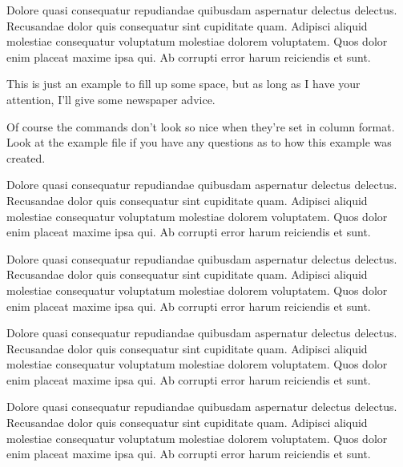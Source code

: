 \documentclass{article}
\begin{document}
\begin{multicols}{2}
{Dolore quasi consequatur repudiandae quibusdam aspernatur delectus delectus. Recusandae dolor quis consequatur sint cupiditate quam. Adipisci aliquid molestiae consequatur voluptatum molestiae dolorem voluptatem. Quos dolor enim placeat maxime ipsa qui. Ab corrupti error harum reiciendis et sunt.

\closearticle

This is just an example to fill up some space, but as long as I have your attention, I'll give some newspaper advice.


Of course the commands don't look so nice when they're set in column format.  Look at the example file if you have any questions as to how this example was created.

Dolore quasi consequatur repudiandae quibusdam aspernatur delectus delectus. Recusandae dolor quis consequatur sint cupiditate quam. Adipisci aliquid molestiae consequatur voluptatum molestiae dolorem voluptatem. Quos dolor enim placeat maxime ipsa qui. Ab corrupti error harum reiciendis et sunt.

Dolore quasi consequatur repudiandae quibusdam aspernatur delectus delectus. Recusandae dolor quis consequatur sint cupiditate quam. Adipisci aliquid molestiae consequatur voluptatum molestiae dolorem voluptatem. Quos dolor enim placeat maxime ipsa qui. Ab corrupti error harum reiciendis et sunt.

Dolore quasi consequatur repudiandae quibusdam aspernatur delectus delectus. Recusandae dolor quis consequatur sint cupiditate quam. Adipisci aliquid molestiae consequatur voluptatum molestiae dolorem voluptatem. Quos dolor enim placeat maxime ipsa qui. Ab corrupti error harum reiciendis et sunt.

Dolore quasi consequatur repudiandae quibusdam aspernatur delectus delectus. Recusandae dolor quis consequatur sint cupiditate quam. Adipisci aliquid molestiae consequatur voluptatum molestiae dolorem voluptatem. Quos dolor enim placeat maxime ipsa qui. Ab corrupti error harum reiciendis et sunt.


\closearticle
}
\end{multicols}
\end{document}
